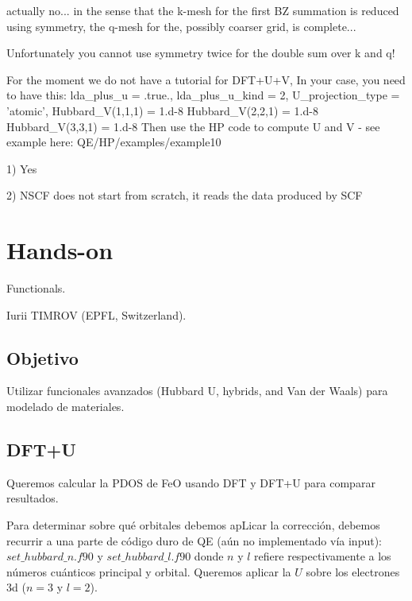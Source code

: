   actually no... in the sense that the k-mesh for the first BZ summation is reduced using symmetry, the q-mesh for the, possibly coarser grid, is complete...

  Unfortunately you cannot use symmetry twice for the double sum over k and q!


  For the moment we do not have a tutorial for DFT+U+V, In your case, you need to have this:
      lda\_plus\_u = .true.,
      lda\_plus\_u\_kind = 2,
      U\_projection\_type = 'atomic',
      Hubbard\_V(1,1,1) = 1.d-8
      Hubbard\_V(2,2,1) = 1.d-8
      Hubbard\_V(3,3,1) = 1.d-8
  Then use the HP code to compute U and V - see example here: QE/HP/examples/example10


  1) Yes

  2) NSCF does not start from scratch, it reads the data produced by SCF

\section{Hands-on}

 Functionals.

 Iurii TIMROV (EPFL, Switzerland).

\subsection{Objetivo}

  Utilizar funcionales avanzados (Hubbard U, hybrids, and Van der Waals) para modelado de materiales.

\subsection{DFT+U}

  Queremos calcular la PDOS de FeO usando DFT y DFT+U para comparar resultados.

  Para determinar sobre qué orbitales debemos apLicar la corrección, debemos recurrir a una parte de código duro de QE (aún no implementado vía input): $set\_hubbard\_n.f90$ y $set\_hubbard\_l.f90$ donde $n$ y $l$ refiere respectivamente a los números cuánticos principal y orbital. Queremos aplicar la $U$ sobre los electrones 3d ($n=3$ y $l=2$).

